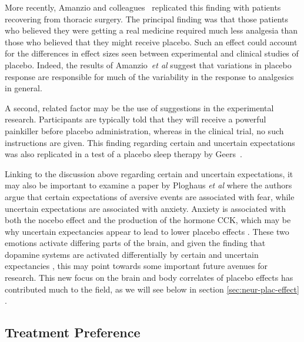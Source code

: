 More recently, Amanzio and colleagues~\cite{Amanzio2001} replicated this finding with patients recovering from thoracic surgery. The principal finding was that those patients who believed they were getting a real medicine required much less analgesia than those who believed that they might receive placebo. Such an effect could account for the differences in effect sizes seen between experimental and clinical studies of placebo. Indeed, the results of  Amanzio~\textit{et al} suggest that variations in placebo response are responsible for much of the variability in the response to analgesics in general.

A second, related factor may be the use of suggestions in the experimental research. Participants are typically told that they will receive a powerful painkiller before placebo administration, whereas in the clinical trial, no such instructions are given. This finding regarding certain and uncertain expectations was also replicated in a test of a placebo sleep therapy by Geers~\cite{Geers2005a}.

Linking to the discussion above regarding certain and uncertain expectations, it may also be important to examine a paper by Ploghaus {\it et al\/} \cite{Ploghaus2003} where the authors argue that certain expectations of aversive events are associated with fear, while uncertain expectations are associated with anxiety. Anxiety is associated with both the nocebo effect and the production of the hormone CCK, which may be why uncertain expectancies appear to lead to lower placebo effects \cite{Colloca2008b}. These two emotions activate differing parts of the brain, and given the finding that dopamine systems are activated differentially by certain and uncertain expectancies \cite{Scott2007a}, this may point towards some important future avenues for research. This new focus on the brain and body correlates of placebo effects has contributed much to the field, as we will see below in section \ref{sec:neur-plac-effect} .

\subsection{Treatment Preference}
\label{sec:treatment-preference}


